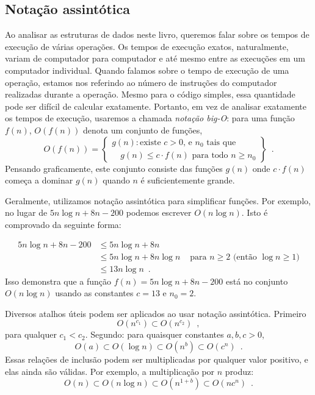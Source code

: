 \subsection{Notação assintótica}

%
%
%
Ao analisar as estruturas de dados neste livro, queremos falar sobre os 
tempos de execução de várias operações. Os tempos de execução exatos, 
naturalmente, variam de computador para computador e até mesmo entre as
execuções 
em um computador individual. Quando falamos sobre o tempo de execução de 
uma operação, estamos nos referindo ao número de instruções do computador 
realizadas durante a operação. Mesmo para o código simples, essa quantidade 
pode ser difícil de calcular exatamente. Portanto, em vez de analisar 
exatamente os tempos de execução, usaremos a chamada  
\emph{notação big-O}: para uma função $f(n)$, $O(f(n))$ denota um conjunto de
funções,
\[
O(f(n)) = \left\{
\begin{array}{l}
g(n):\mbox{existe $c>0$, e $n_0$ tais que} \\
\quad\mbox{$g(n) \le c\cdot f(n)$ para todo $n\ge n_0$}   
\end{array} \right\} \enspace .
\]
Pensando graficamente, este conjunto consiste das funções $g(n)$ onde 
$c\cdot f(n)$ começa a dominar $g(n)$ quando $n$ é suficientemente grande.

Geralmente, utilizamos notação assintótica para simplificar funções. Por
exemplo, 
no lugar de $5n\log n + 8n - 200$ podemos escrever $O(n\log n)$. 
Isto é comprovado da seguinte forma:

\begin{align*} 
5n\log n + 8n - 200
& \le 5n\log n + 8n \\
& \le 5n\log n + 8n\log n & \mbox{ para $n\ge 2$ (então $\log n \ge 1$)}
\\
& \le 13n\log n  \enspace .
\end{align*}
Isso demonstra que a função $f(n)=5n\log n + 8n - 200$  está no 
conjunto $O(n\log n)$ usando as constantes $c=13$ e $n_0 = 2$.

Diversos atalhos úteis podem ser aplicados ao usar notação 
assintótica. Primeiro
\[ O(n^{c_1}) \subset O(n^{c_2}) \enspace ,\]
para qualquer $c_1 < c_2$.  Segundo: para quaisquer constantes $a,b,c > 0$,
\[ O(a) \subset O(\log n) \subset O(n^{b}) \subset O({c}^n) \enspace . \]
Essas relações de inclusão podem ser multiplicadas por qualquer valor positivo, 
e elas ainda são válidas. Por exemplo, a multiplicação por $n$ produz:
\[ O(n) \subset O(n\log n) \subset O(n^{1+b}) \subset O(n{c}^n) \enspace . \]

